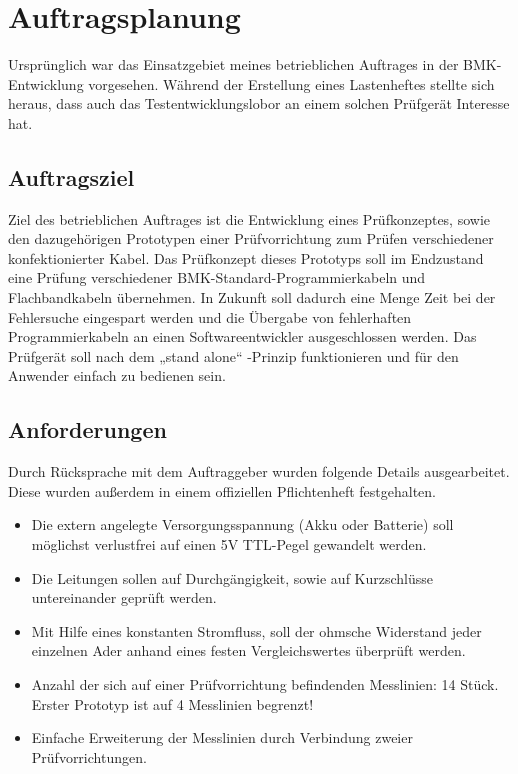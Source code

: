 \section{Auftragsplanung}

Ursprünglich war das Einsatzgebiet meines betrieblichen Auftrages in der BMK-Entwicklung vorgesehen. Während der Erstellung eines Lastenheftes stellte sich heraus, dass auch das Testentwicklungslobor an einem solchen Prüfgerät Interesse hat. 



\subsection{Auftragsziel}

Ziel des betrieblichen Auftrages ist die Entwicklung eines Prüfkonzeptes, sowie den dazugehörigen Prototypen einer Prüfvorrichtung zum Prüfen verschiedener konfektionierter Kabel. Das Prüfkonzept dieses Prototyps soll im Endzustand eine Prüfung verschiedener BMK-Standard-Programmierkabeln und Flachbandkabeln übernehmen. 
In Zukunft soll dadurch eine Menge Zeit bei der Fehlersuche eingespart werden und die Übergabe von fehlerhaften Programmierkabeln an einen Softwareentwickler ausgeschlossen werden.
Das Prüfgerät soll nach dem „stand alone“ -Prinzip funktionieren und für den Anwender einfach zu bedienen sein.


\subsection{Anforderungen}

Durch Rücksprache mit dem Auftraggeber wurden folgende Details ausgearbeitet. Diese wurden außerdem in einem offiziellen Pflichtenheft festgehalten. 

\begin{itemize}
	\item{Die extern angelegte Versorgungsspannung (Akku oder Batterie) soll möglichst verlustfrei auf einen 5V TTL-Pegel gewandelt werden. }

	\item{Die Leitungen sollen auf Durchgängigkeit, sowie auf Kurzschlüsse untereinander geprüft werden.}
	
	\item{Mit Hilfe eines konstanten Stromfluss, soll der ohmsche Widerstand jeder einzelnen Ader anhand eines festen Vergleichswertes überprüft werden.}
	
	\item{Anzahl der sich auf einer Prüfvorrichtung befindenden Messlinien: 14 Stück.
Erster Prototyp ist auf 4 Messlinien begrenzt!}

	\item{Einfache Erweiterung der Messlinien durch Verbindung zweier Prüfvorrichtungen.}
\end{itemize}


